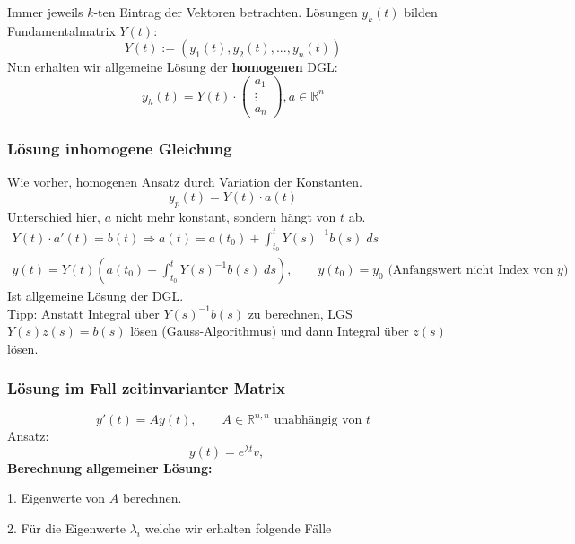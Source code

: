 \documentclass[a4paper]{article}
\newcommand{\R}{\mathbb{R}}
\begin{document}
Immer jeweils $k$-ten Eintrag der Vektoren betrachten.
Lösungen $y_k (t)$ bilden Fundamentalmatrix $Y(t)$:
\[
	Y(t) := (y_1 (t), y_2 (t), ..., y_n (t))
\] 
Nun erhalten wir allgemeine Lösung der \textbf{homogenen} DGL:
\[
	y_h (t) = Y(t) \cdot \begin{pmatrix} a_1 \\ \vdots \\ a_n \end{pmatrix},
	a \in \R ^{n}
\]

\subsubsection{Lösung inhomogene Gleichung}
Wie vorher, homogenen Ansatz durch Variation der Konstanten.
\[
	y_p (t) = Y(t) \cdot a(t)
\]
Unterschied hier, $a$ nicht mehr konstant, sondern hängt von $t$ ab.
\begin{gather*}
	Y(t) \cdot a' (t) = b(t)
	\Rightarrow a(t) = a(t_0) +
	\int_{t_0}^{t} Y (s) ^{-1} b(s) \; ds \\
	y(t) = Y(t) \left(
		a(t_0) + 
		\int_{t_0}^{t} Y (s)^{-1}  b(s) \; ds
	\right), \qquad
	y(t_0) = y_0
	\text{ (Anfangswert nicht Index von $y$) }
\end{gather*}
Ist allgemeine Lösung der DGL.
\\

Tipp: Anstatt Integral über $Y(s) ^{-1} b(s)$ zu berechnen, LGS
$Y(s)z(s) = b(s)$ lösen (Gauss-Algorithmus) und dann Integral über
$z(s)$ lösen.

\subsubsection{Lösung im Fall zeitinvarianter Matrix}
\[
	y'(t) = A y(t), \qquad
	A \in \R ^{n,n} \text{ unabhängig von $t$}
\]
Ansatz:
\[
	y(t) = e ^{\lambda t} v, \quad
\] 
\textbf{Berechnung allgemeiner Lösung:} 

1. Eigenwerte von $A$ berechnen.

2. Für die Eigenwerte $\lambda_i$ welche wir erhalten folgende
Fälle 
\end{document}
